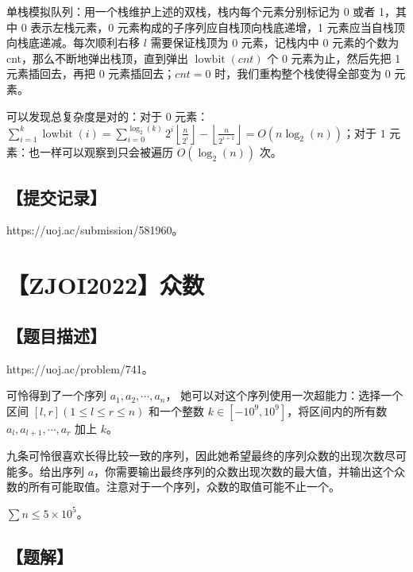 \documentclass[UTF8,12pt,a4paper]{ctexart}
\begin{document}
	单栈模拟队列：用一个栈维护上述的双栈，栈内每个元素分别标记为 0 或者 1，其中 0 表示左栈元素，0 元素构成的子序列应自栈顶向栈底递增，1 元素应当自栈顶向栈底递减。每次顺利右移 $l$ 需要保证栈顶为 $0$ 元素，记栈内中 0 元素的个数为 cnt，那么不断地弹出栈顶，直到弹出 $\operatorname{lowbit}(cnt)$ 个 0 元素为止，然后先把 1 元素插回去，再把 0 元素插回去；$cnt=0$ 时，我们重构整个栈使得全部变为 0 元素。
	
	可以发现总复杂度是对的：对于 0 元素：$\sum_{i=1}^k \operatorname{lowbit}(i)=\sum_{i=0}^{\log_2(k)} 2^i \left\lfloor \frac{n}{2^i} \right\rfloor - \left\lfloor \frac{n}{2^{i + 1}} \right\rfloor=O(n\log_2(n))$；对于 $1$ 元素：也一样可以观察到只会被遍历 $O(\log_2(n))$ 次。
	
	\subsection*{【提交记录】}
	
	https://uoj.ac/submission/581960。
	
	
	\section*{【ZJOI2022】众数}
	
	\subsection*{【题目描述】}
	
	https://uoj.ac/problem/741。
	
	可怜得到了一个序列 $a_1,a_2,\cdots,a_n$， 她可以对这个序列使用一次超能力：选择一个区间 $[l,r](1\le l\le r\le n)$ 和一个整数 $k\in [−10^9,10^9]$，将区间内的所有数 $a_l,a_{l+1},\cdots,a_r$ 加上 $k$。
	
	九条可怜很喜欢长得比较一致的序列，因此她希望最终的序列众数的出现次数尽可能多。给出序列 $a$，你需要输出最终序列的众数出现次数的最大值，并输出这个众数的所有可能取值。注意对于一个序列，众数的取值可能不止一个。
	
	$\sum n\le 5\times 10^5$。
	
	\subsection*{【题解】}
	
\end{document}
